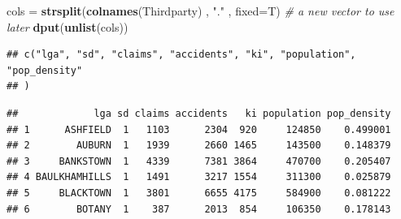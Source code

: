 \documentclass[]{book}
\newenvironment{Shaded}{\begin{snugshade}}{\end{snugshade}}
\newcommand{\KeywordTok}[1]{\textcolor[rgb]{0.13,0.29,0.53}{\textbf{{#1}}}}
\newcommand{\DataTypeTok}[1]{\textcolor[rgb]{0.13,0.29,0.53}{{#1}}}
\newcommand{\DecValTok}[1]{\textcolor[rgb]{0.00,0.00,0.81}{{#1}}}
\newcommand{\StringTok}[1]{\textcolor[rgb]{0.31,0.60,0.02}{{#1}}}
\newcommand{\CommentTok}[1]{\textcolor[rgb]{0.56,0.35,0.01}{\textit{{#1}}}}
\newcommand{\OtherTok}[1]{\textcolor[rgb]{0.56,0.35,0.01}{{#1}}}
\newcommand{\NormalTok}[1]{{#1}}
\begin{document}
\begin{Shaded}
\begin{Highlighting}[]
\NormalTok{cols =}\StringTok{ }\KeywordTok{strsplit}\NormalTok{(}\KeywordTok{colnames}\NormalTok{(Thirdparty) , }\StringTok{"."} \NormalTok{, }\DataTypeTok{fixed=}\NormalTok{T)   }\CommentTok{# a new vector to use later }
\KeywordTok{dput}\NormalTok{(}\KeywordTok{unlist}\NormalTok{(cols))}
\end{Highlighting}
\end{Shaded}

\begin{verbatim}
## c("lga", "sd", "claims", "accidents", "ki", "population", "pop_density"
## )
\end{verbatim}

\begin{Shaded}
\end{Shaded}

\begin{verbatim}
##             lga sd claims accidents   ki population pop_density
## 1      ASHFIELD  1   1103      2304  920     124850    0.499001
## 2        AUBURN  1   1939      2660 1465     143500    0.148379
## 3     BANKSTOWN  1   4339      7381 3864     470700    0.205407
## 4 BAULKHAMHILLS  1   1491      3217 1554     311300    0.025879
## 5     BLACKTOWN  1   3801      6655 4175     584900    0.081222
## 6        BOTANY  1    387      2013  854     106350    0.178143
\end{verbatim}
\end{document}
